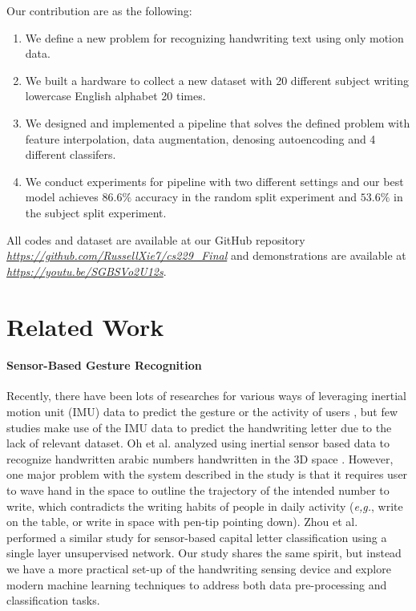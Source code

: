 \documentclass{article}
\begin{document}
\begin{multicols*}{2}
Our contribution are as the following:
\begin{enumerate}[label=-]
    \item We define a new problem for recognizing handwriting text using only motion data.
    \item We built a hardware to collect a new dataset with 20 different subject writing lowercase English alphabet 20 times.
    \item We designed and implemented a pipeline that solves the defined problem with feature interpolation, data augmentation, denosing autoencoding and 4 different classifers.
    \item We conduct experiments for pipeline with two different settings and our best model achieves $86.6\%$ accuracy in the random split experiment and $53.6\%$ in the subject split experiment.
\end{enumerate}

All codes and dataset are available at our GitHub repository \textit{\href{https://github.com/RussellXie7/cs229_Final}{https://github.com/RussellXie7/cs229\_Final}} and demonstrations are available at \textit{\href{https://www.youtube.com/watch?v=SGBSVo2U12s}{https://youtu.be/SGBSVo2U12s}}.

\section{Related Work}

\paragraph{Sensor-Based Gesture Recognition} Recently, there have been lots of researches for various ways of leveraging inertial motion unit (IMU) data to predict the gesture or the activity of users \cite{Kim_2019, ganguly2018kinect, 7418327, 6470686, 6208895}, but few studies make use of the IMU data to predict the handwriting letter due to the lack of relevant dataset. Oh et al. analyzed using inertial sensor based data to recognize handwritten arabic numbers handwritten in the 3D space \cite{1363896}. However, one major problem with the system described in the study is that it requires user to wave hand in the space to outline the trajectory of the intended number to write, which contradicts the writing habits of people in daily activity (\textit{e,g.}, write on the table, or write in space with pen-tip pointing down). Zhou et al. \cite{4601870} performed a similar study for sensor-based capital letter classification using a single layer unsupervised network. Our study shares the same spirit, but instead we have a more practical set-up of the handwriting sensing device and explore modern machine learning techniques to address both data pre-processing and classification tasks.



\end{multicols*}
\end{document}
